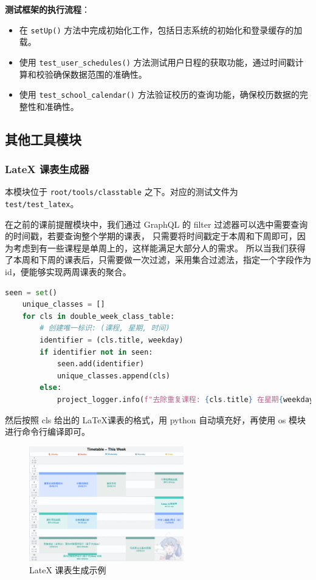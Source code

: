 \documentclass[14pt,a4paper,UTF8,twoside]{article}
\begin{document}
    \textbf{测试框架的执行流程}：
    \begin{itemize}
        \item 在 \texttt{setUp()} 方法中完成初始化工作，包括日志系统的初始化和登录缓存的加载。
        \item 使用 \texttt{test\_user\_schedules()} 方法测试用户日程的获取功能，通过时间戳计算和校验确保数据范围的准确性。
        \item 使用 \texttt{test\_school\_calendar()} 方法验证校历的查询功能，确保校历数据的完整性和准确性。
    \end{itemize}

    \subsection{其他工具模块}

    \subsubsection{LateX 课表生成器}

    本模块位于 \texttt{root/tools/classtable} 之下。对应的测试文件为 \texttt{test/test\_latex}。

    在之前的课前提醒模块中，我们通过 GraphQL 的 filter 过滤器可以选中需要查询的时间戳，若要查询整个学期的课表，
    只需要将时间戳定于本周和下周即可，因为考虑到有一些课程是单周上的，这样能满足大部分人的需求。
    所以当我们获得了本周和下周的课表后，只需要做一次过滤，采用集合过滤法，指定一个字段作为 id，便能够实现两周课表的聚合。

    \begin{lstlisting}[language = python]
    seen = set()
    unique_classes = []
    for cls in double_week_class_table:
        # 创建唯一标识: (课程, 星期, 时间)
        identifier = (cls.title, weekday)
        if identifier not in seen:
            seen.add(identifier)
            unique_classes.append(cls)
        else:
            project_logger.info(f"去除重复课程: {cls.title} 在星期{weekday + 1} {class_time}")
    \end{lstlisting}

    然后按照 cls 给出的 \LaTeX 课表的格式，用 python 自动填充好，再使用 os 模块进行命令行编译即可。

    \begin{figure}[H]
        \centering
        \includegraphics[width=0.6\textwidth]{img/classtable_example.png}
        \caption{LateX 课表生成示例}
        \label{fig:latex_table}
    \end{figure}
\end{document}
